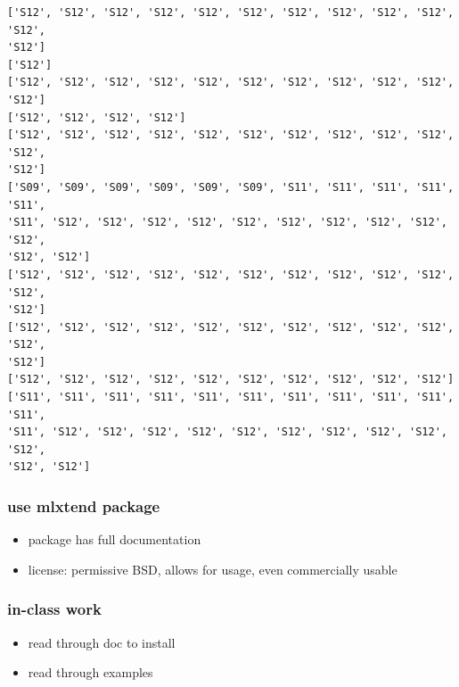 \documentclass[11pt]{article}
\providecommand{\tightlist}{%
      \setlength{\itemsep}{0pt}\setlength{\parskip}{0pt}}
\begin{document}
    \begin{Verbatim}[commandchars=\\\{\}]
['S12', 'S12', 'S12', 'S12', 'S12', 'S12', 'S12', 'S12', 'S12', 'S12', 'S12',
'S12']
['S12']
['S12', 'S12', 'S12', 'S12', 'S12', 'S12', 'S12', 'S12', 'S12', 'S12', 'S12']
['S12', 'S12', 'S12', 'S12']
['S12', 'S12', 'S12', 'S12', 'S12', 'S12', 'S12', 'S12', 'S12', 'S12', 'S12',
'S12']
['S09', 'S09', 'S09', 'S09', 'S09', 'S09', 'S11', 'S11', 'S11', 'S11', 'S11',
'S11', 'S12', 'S12', 'S12', 'S12', 'S12', 'S12', 'S12', 'S12', 'S12', 'S12',
'S12', 'S12']
['S12', 'S12', 'S12', 'S12', 'S12', 'S12', 'S12', 'S12', 'S12', 'S12', 'S12',
'S12']
['S12', 'S12', 'S12', 'S12', 'S12', 'S12', 'S12', 'S12', 'S12', 'S12', 'S12',
'S12']
['S12', 'S12', 'S12', 'S12', 'S12', 'S12', 'S12', 'S12', 'S12', 'S12']
['S11', 'S11', 'S11', 'S11', 'S11', 'S11', 'S11', 'S11', 'S11', 'S11', 'S11',
'S11', 'S12', 'S12', 'S12', 'S12', 'S12', 'S12', 'S12', 'S12', 'S12', 'S12',
'S12', 'S12']
    \end{Verbatim}

    \subsubsection{use mlxtend package}\label{use-mlxtend-package}

\begin{itemize}
\tightlist
\item
  package has full documentation
\item
  license: permissive BSD, allows for usage, even commercially usable
\end{itemize}

    \subsubsection{in-class work}\label{in-class-work}

\begin{itemize}
\tightlist
\item
  read through doc to install
\item
  read through examples
\end{itemize}
\end{document}
